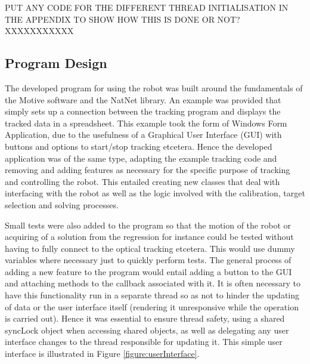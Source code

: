 \documentclass[11pt]{article}
\begin{document}
PUT ANY CODE FOR THE DIFFERENT THREAD INITIALISATION IN THE APPENDIX TO SHOW HOW THIS IS DONE OR NOT? XXXXXXXXXXX


\pagebreak
\subsection{Program Design}
The developed program for using the robot was built around the fundamentals of the Motive software and the NatNet library. An example was provided that simply sets up a connection between the tracking program and displays the tracked data in a spreadsheet. This example took the form of Windows Form Application, due to the usefulness of a Graphical User Interface (GUI) with buttons and options to start/stop tracking etcetera. Hence the developed application was of the same type, adapting the example tracking code and removing and adding features as necessary for the specific purpose of tracking and controlling the robot. This entailed creating new classes that deal with interfacing with the robot as well as the logic involved with the calibration, target selection and solving processes. 

Small tests were also added to the program so that the motion of the robot or acquiring of a solution from the regression for instance could be tested without having to fully connect to the optical tracking etcetera. This would use dummy variables where necessary just to quickly perform tests. The general process of adding a new feature to the program would entail adding a button to the GUI and attaching methods to the callback associated with it. It is often necessary to have this functionality run in a separate thread so as not to hinder the updating of data or the user interface itself (rendering it unresponsive while the operation is carried out). Hence it was essential to ensure thread safety, using a shared syncLock object when accessing shared objects, as well as delegating any user interface changes to the thread responsible for updating it. This simple user interface is illustrated in Figure \ref{figure:userInterface}.
\end{document}

